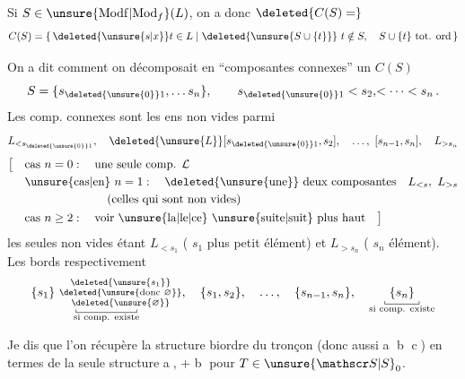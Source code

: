 Si $S\in\unsure{\mathrm{Modf}|\mathrm{Mod}_{f}}(L)$, on a donc $\deleted{C(S)=}$
\[
C(S)=\{\,\deleted{\unsure{s|x}}t\in L\mid\deleted{\unsure{S\cup\{t\}}}\ t\notin S,\quad S\cup\{t\}\ \text{tot. ord}\,\}
\]

On a dit comment on décomposait en ``composantes connexes'' un $C(S)$ 
\[
 S=\{s_{\deleted{\unsure{0}}1},\ldots s_n\},\qquad s_{\deleted{\unsure{0}}1}<s_2,\!<\cdots<s_n\,.
\]
Les comp. connexes sont les ens non vides parmi
\[
L_{<s_{\deleted{\unsure{0}}1}},\quad \deleted{\unsure{L}}[s_{\deleted{\unsure{0}}1},s_2],\quad\ldots,\ [s_{n-1},s_n],\quad L_{>s_n}
\]
\[
\begin{aligned}
\bigl[\quad&\text{cas }n=0:\quad\text{une seule comp. }\mathcal L\\
&\text{\unsure{cas|en} }n=1:\quad\deleted{\text{\unsure{une}}}\ \text{deux composantes}\quad L_{<s},\ L_{>s}\\
&\hspace{7em}\text{(celles qui sont non vides)}\\
&\text{cas }n\geq2:\quad\text{voir \unsure{la|le|ce} \unsure{suite|suit} plus haut}\quad\bigr]
\end{aligned}
\]
les seules non vides  étant $L_{<s_1}$ ( $s_1$ plus petit élément) et $L_{>s_n}$ ( $s_n$  élément). Les bords  respectivement
\[
\underset{\substack{\rule{.4pt}{.6ex}\rule{4.8em}{.4pt}\rule{.4pt}{.6ex}\\\text{si comp. existe}}}{\{s_1\}\ \substack{\deleted{\unsure{s_1}}\\\deleted{\unsure{\text{donc }\varnothing}}\\\deleted{\unsure{\varnothing}}}},
\quad\{s_1,s_2\},\quad\ldots,\quad\{s_{n-1},s_n\},\quad
\underset{\substack{\rule{.4pt}{.6ex}\rule{2.7em}{.4pt}\rule{.4pt}{.6ex}\\\text{si comp. existe}}}{\{s_n\}}
\]

Je dis que l'on récupère la structure   biordre du tronçon (donc aussi  \textcircled{a} \textcircled{b} \textcircled{c}) en termes de la seule structure \textcircled{a}, $+$ \textcircled{b} pour $T\in\unsure{\mathscr S|S}_0$.
